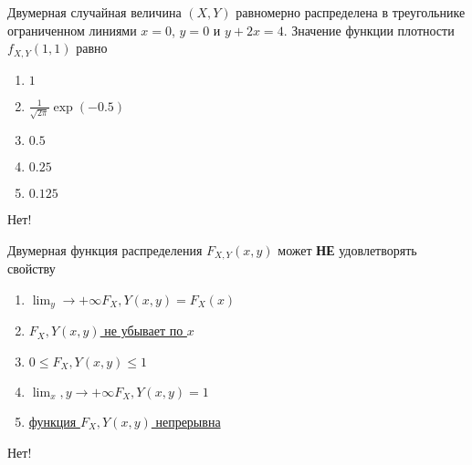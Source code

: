 \documentclass[t]{beamer}
\begin{document}
 \begin{frame} \label{2-No} 
\begin{block}{2} 

Двумерная случайная величина $(X, Y)$ равномерно распределена в треугольнике ограниченном линиями $x=0$, $y=0$ и $y+2x=4$. Значение функции плотности $f_{X,Y}(1,1)$ равно
  


 \end{block} 
\begin{enumerate} 
\item[] \hyperlink{2-No}{\beamergotobutton{} $1$}
\item[] \hyperlink{2-No}{\beamergotobutton{} $\frac{1}{\sqrt{2\pi}}\exp(-0.5)$}
\item[] \hyperlink{2-No}{\beamergotobutton{} $0.5$}
\item[] \hyperlink{2-Yes}{\beamergotobutton{} $0.25$}
\item[] \hyperlink{2-No}{\beamergotobutton{} $0.125$}
\end{enumerate} 

 \alert{Нет!} 
\end{frame} 


 \begin{frame} \label{3-No} 
\begin{block}{3} 

  Двумерная функция распределения $F_{X,Y}(x,y)$ может \textbf{НЕ} удовлетворять свойству
  


 \end{block} 
\begin{enumerate} 
\item[] \hyperlink{3-No}{\beamergotobutton{} $\lim_y \to +\infty F_X,Y(x,y) = F_X(x)$}
\item[] \hyperlink{3-Yes}{\beamergotobutton{} $F_X,Y(x,y)$ не убывает по $x$}
\item[] \hyperlink{3-No}{\beamergotobutton{} $0 \leq F_X,Y(x, y)\leq 1$}
\item[] \hyperlink{3-No}{\beamergotobutton{} $\lim_x,y \to +\infty F_X,Y(x,y) = 1$}
\item[] \hyperlink{3-No}{\beamergotobutton{} функция $F_X,Y(x, y)$ непрерывна}
\end{enumerate} 

 \alert{Нет!} 
\end{frame} 
\end{document}
